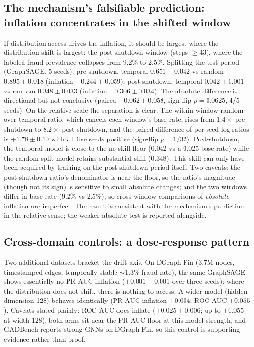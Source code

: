 \documentclass[10pt]{article}
\begin{document}
\subsection{The mechanism's falsifiable prediction: inflation concentrates in the
shifted window}
If distribution access drives the inflation, it should be largest where the
distribution shift is largest: the post-shutdown window (steps $\geq$43), where the
labeled fraud prevalence collapses from 9.2\% to 2.5\%. Splitting the test period
(GraphSAGE, 5 seeds): pre-shutdown, temporal $0.651\pm0.042$ vs random
$0.895\pm0.018$ (inflation $+0.244\pm0.059$); post-shutdown, temporal
$0.042\pm0.001$ vs random $0.348\pm0.033$ (inflation $+0.306\pm0.034$). The
absolute difference is directional but not conclusive (paired $+0.062\pm0.058$,
sign-flip $p=0.0625$, 4/5 seeds). On the relative scale the separation is
clear. The within-window random-over-temporal ratio, which cancels each
window's base rate, rises from $1.4\times$ pre-shutdown to $8.2\times$
post-shutdown, and the paired difference of per-seed log-ratios is $+1.78\pm0.10$
with all five seeds positive (sign-flip $p=1/32$). Post-shutdown, the temporal
model is close to the no-skill floor (0.042 vs a 0.025 base rate) while
the random-split model retains substantial skill (0.348). This skill can only
have been acquired by training on the post-shutdown period itself. Two caveats: the
post-shutdown ratio's denominator is near the floor, so the ratio's magnitude
(though not its sign) is sensitive to small absolute changes; and the two windows
differ in base rate (9.2\% vs 2.5\%), so cross-window comparisons of
\emph{absolute} inflation are imperfect. The result is consistent with the
mechanism's prediction in the relative sense; the weaker absolute test is
reported alongside.

\subsection{Cross-domain controls: a dose-response pattern}
Two additional datasets bracket the drift axis. On DGraph-Fin
\citep{huang2022dgraph} (3.7M nodes, timestamped edges, temporally stable
$\sim$1.3\% fraud rate), the same GraphSAGE shows essentially no PR-AUC inflation
($+0.001\pm0.001$ over three seeds): where the distribution does not shift, there
is nothing to access. A wider model (hidden dimension 128) behaves identically
(PR-AUC inflation $+0.004$; ROC-AUC $+0.055$). Caveats stated plainly: ROC-AUC
does inflate ($+0.025\pm0.006$; up to $+0.055$ at width 128), both arms sit near
the PR-AUC floor at this model strength, and GADBench reports strong GNNs on
DGraph-Fin, so this control is supporting evidence rather than proof.
\end{document}
